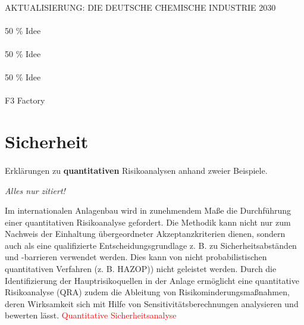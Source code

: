 \paragraph*{\cite{PerspektiveC_2016}} AKTUALISIERUNG: DIE DEUTSCHE CHEMISCHE INDUSTRIE 2030

\paragraph*{\cite{Schembecker_2009}} 50 \% Idee
\paragraph*{\cite{Processnet_2010}}50 \% Idee
\paragraph*{\cite{Processnet_2009}}50 \% Idee
\paragraph*{\cite{f3_2014}} F3 Factory
\paragraph*{\cite{copiride_2014}}

\section{Sicherheit}
\paragraph*{\cite{Rath_2009}} Erkl\"arungen zu \textbf{quantitativen} Risikoanalysen anhand zweier Beispiele. \hfill \newline

\textit{Alles nur zitiert!} \hfill \newline

Im internationalen Anlagenbau wird in zunehmendem Ma\ss{}e die Durchf\"uhrung einer quantitativen Risikoanalyse gefordert. Die Methodik kann nicht nur zum Nachweis der Einhaltung \"ubergeordneter Akzeptanzkriterien dienen, sondern auch als eine qualifizierte Entscheidungsgrundlage z. B. zu Sicherheitsabst\"anden und -barrieren verwendet werden. Dies kann von nicht probabilistischen quantitativen Verfahren (z. B. HAZOP)) nicht geleistet werden. Durch die Identifizierung der Hauptrisikoquellen in der Anlage erm\"oglicht eine quantitative Risikoanalyse (QRA) zudem die Ableitung von Risikominderungsma\ss{}nahmen, deren
Wirksamkeit sich mit Hilfe von Sensitivit\"atsberechnungen analysieren und bewerten l\"asst. \textcolor{red}{Quantitative Sicherheitsanalyse}

